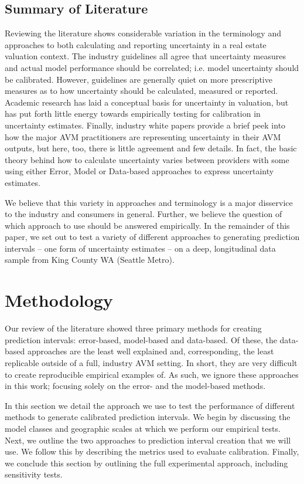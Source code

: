 \documentclass[colTwo]{format}
\theoremstyle{definition}
\begin{document}
\subsection{Summary of Literature}

Reviewing the literature shows considerable variation in the terminology and approaches to both calculating and reporting uncertainty in a real estate valuation context.  The industry guidelines all agree that uncertainty measures and actual model performance should be correlated; i.e. model uncertainty should be calibrated.  However, guidelines are generally quiet on more prescriptive measures as to how uncertainty should be calculated, measured or reported.  Academic research has laid a conceptual basis for uncertainty in valuation, but has put forth little energy towards empirically testing for calibration in uncertainty estimates.  Finally, industry white papers provide a brief peek into how the major AVM practitioners are representing uncertainty in their AVM outputs, but here, too, there is little agreement and few details. In fact, the basic theory behind how to calculate uncertainty varies between providers with some using either Error, Model or Data-based approaches to express uncertainty estimates.   

We believe that this variety in approaches and terminology is a major disservice to the industry and consumers in general.  Further, we believe the question of which approach to use should be answered empirically.  In the remainder of this paper, we set out to test a variety of different approaches to generating prediction intervals -- one form of uncertainty estimates -- on a deep, longitudinal data sample from King County WA (Seattle Metro).
 
\section{Methodology}

Our review of the literature showed three primary methods for creating prediction intervals: error-based, model-based and data-based.  Of these, the data-based approaches are the least well explained and, corresponding, the least replicable outside of a full, industry AVM setting. In short, they are very difficult to create reproducible empirical examples of.  As such, we ignore these approaches in this work; focusing solely on the error- and the model-based methods.

In this section we detail the approach we use to test the performance of different methods to generate calibrated prediction intervals. We begin by discussing the model classes and geographic scales at which we perform our empirical tests.  Next, we outline the two approaches to prediction interval creation that we will use.  We follow this by describing the metrics used to evaluate calibration.  Finally, we conclude this section by outlining the full experimental approach, including sensitivity tests. 
\end{document}
